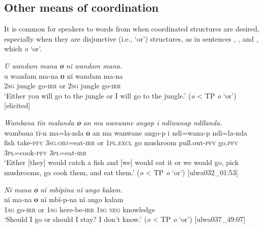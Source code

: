 \subsection{Other means of coordination}\label{sec:12.1.3}


It is common for speakers to  words from  when coordinated structures are desired, especially when they are  disjunctive (i.e., ‘or’) structures, as in sentences , , and , which   \textit{o} ‘or’.

\ea%
    \label{ex:complex:28}
          \textit{U wandam mana} \textbf{\textit{o}} \textit{nï wandam mana.}\\
\gll    u    wandam  ma-na  \textbf{o}  nï    wandam  ma-na\\
    2\textsc{sg}  jungle    go-\textsc{irr}  or  \textsc{2sg}  jungle    go-\textsc{irr}\\
\glt `Either you will go to the jungle or I will go to the jungle.’ (\textit{o} < TP \textit{o} ‘or’) [elicited]
\z

\ea%
    \label{ex:complex:29}
        \textit{Wambana tïn malanda} \textbf{\textit{o}} \textit{an ma wanwane angop i ndïwanap ndïlanda.}\\
\gll    wambana  tï-n      ma=la-nda      \textbf{o}  an      ma     wanwane  ango-p      i    ndï=wana-p  ndï=la-nda\\
    fish    take-\textsc{pfv}  \textsc{3sg.obj}=eat-\textsc{irr}  or  \textsc{1pl.excl}  go    mushroom  pull.out-\textsc{pfv}  go\textsc{.pfv}  \textsc{3pl=}cook\textsc{{}-pfv}  \textsc{3pl=}eat\textsc{{}-irr}\\
\glt `Either [they] would catch a fish and [we] would eat it or we would go, pick mushrooms, go cook them, and eat them.’ (\textit{o} < TP \textit{o} ‘or’) [ulwa032\_01:53]
\z

\ea%
    \label{ex:complex:30}
          \textit{Nï mana} \textbf{\textit{o}} \textit{nï mbïpïna nï ango kalam.}\\
\gll    nï    ma-na  \textbf{o}  nï    mbï-p-na    nï    ango  kalam\\
    1\textsc{sg}  go-\textsc{irr}  or  \textsc{1sg}  here-be-\textsc{irr}  \textsc{1sg}  \textsc{neg}  knowledge\\
\glt `Should I go or should I stay? I don’t know.’ (\textit{o} < TP \textit{o} ‘or’) [ulwa037\_49:07]
\z

